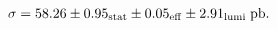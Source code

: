 \begin{equation}
\sigma = 58.26 \pm 0.95_{\rm stat} \pm 0.05_{\rm eff} \pm 2.91_{\rm lumi} \; \rm pb.
\end{equation}
